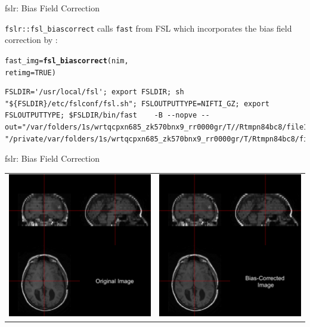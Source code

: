 \documentclass[11pt]{beamer}\usepackage[]{graphicx}\usepackage[]{color}
\makeatletter
\newcommand{\hlnum}[1]{\textcolor[rgb]{0.686,0.059,0.569}{#1}}%
\newcommand{\hlstd}[1]{\textcolor[rgb]{0.345,0.345,0.345}{#1}}%
\newcommand{\hlkwb}[1]{\textcolor[rgb]{0.69,0.353,0.396}{#1}}%
\newcommand{\hlkwc}[1]{\textcolor[rgb]{0.333,0.667,0.333}{#1}}%
\newcommand{\hlkwd}[1]{\textcolor[rgb]{0.737,0.353,0.396}{\textbf{#1}}}%
\newenvironment{kframe}{%
 \def\at@end@of@kframe{}%
 \ifinner\ifhmode%
  \def\at@end@of@kframe{\end{minipage}}%
  \begin{minipage}{\columnwidth}%
 \fi\fi%
 \def\FrameCommand##1{\hskip\@totalleftmargin \hskip-\fboxsep
 \colorbox{shadecolor}{##1}\hskip-\fboxsep
     \hskip-\linewidth \hskip-\@totalleftmargin \hskip\columnwidth}%
 \MakeFramed {\advance\hsize-\width
   \@totalleftmargin\z@ \linewidth\hsize
   \@setminipage}}%
 {\par\unskip\endMakeFramed%
 \at@end@of@kframe}
\newenvironment{knitrout}{}{} %
\makeatother
\begin{document}
\begin{frame}[fragile]{fslr: Bias Field Correction}

\verb|fslr::fsl_biascorrect| calls \verb|fast| from FSL which incorporates the bias field correction by \citet{guillemaud1997estimating}:

\begin{knitrout}
\color{fgcolor}\begin{kframe}
\begin{alltt}
\hlstd{fast_img} \hlkwb{=} \hlkwd{fsl_biascorrect}\hlstd{(nim,}
                           \hlkwc{retimg}\hlstd{=}\hlnum{TRUE}\hlstd{)}
\end{alltt}
\begin{verbatim}
FSLDIR='/usr/local/fsl'; export FSLDIR; sh "${FSLDIR}/etc/fslconf/fsl.sh"; FSLOUTPUTTYPE=NIFTI_GZ; export FSLOUTPUTTYPE; $FSLDIR/bin/fast    -B --nopve --out="/var/folders/1s/wrtqcpxn685_zk570bnx9_rr0000gr/T//Rtmpn84bc8/file130513d4dad28" "/private/var/folders/1s/wrtqcpxn685_zk570bnx9_rr0000gr/T/Rtmpn84bc8/file13051343bba72.nii.gz"; 
\end{verbatim}
\end{kframe}
\end{knitrout}
\end{frame}



\begin{frame}[fragile]{fslr: Bias Field Correction}

\begin{tabular}{cc}
\includegraphics[width=0.5\linewidth]{Orig_Image.png} & \includegraphics[width=0.5\linewidth]{FAST_Image.png}
\end{tabular}

\end{frame}
\end{document}
